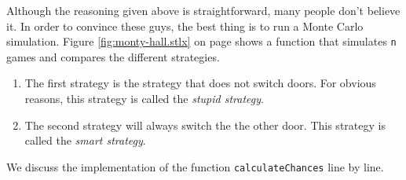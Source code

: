Although the reasoning given above is straightforward, many people don't believe it.  In order to convince these
guys, the best thing is to run a Monte Carlo simulation.  Figure \ref{fig:monty-hall.stlx} on page
\pageref{fig:monty-hall.stlx} shows a function that simulates \texttt{n} games and compares the
different strategies.  
\begin{enumerate}
\item The first strategy is the strategy that does not switch doors.
      For obvious reasons, this strategy is called the \emph{stupid strategy}.
\item The second strategy will always switch the the other door.
      This strategy is called the \emph{smart strategy}.
\end{enumerate}
We discuss the implementation of the function \texttt{calculateChances} line by line.
